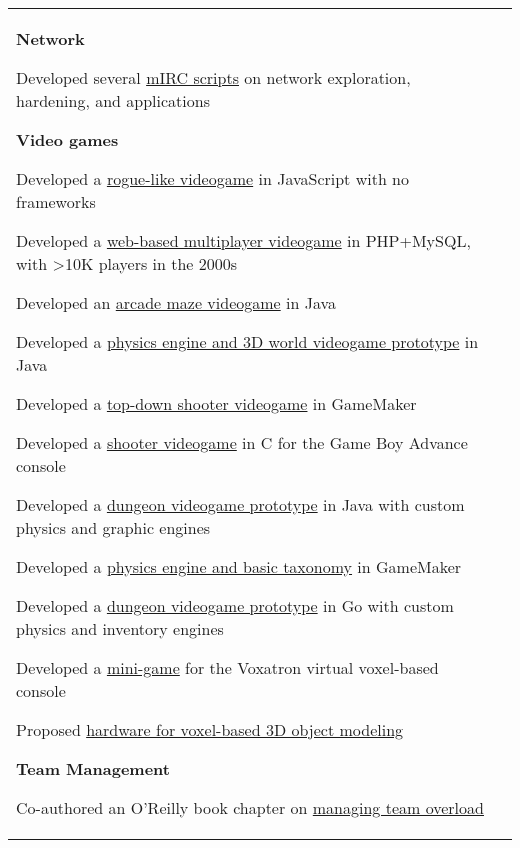 \documentclass[letterpaper,10pt,oneside]{article}
\newcommand{\itemspacingtwo}{\vspace{0.08cm}}
\newenvironment{body}
{\par\par
\begin{longtable}{p{0.145\textwidth}p{0.81\textwidth}}}
{\par\end{longtable}\par}
\begin{document}
\begin{body}
\textbf{Network}
\begin{comp}
\item Developed several \href{https://github.com/lquesada/My-mIRC-Scripts}{mIRC scripts} on network exploration, hardening, and applications
\end{comp}
\itemspacingtwo

\textbf{Video games}
\begin{comp}
\item Developed a \href{https://cavernal.github.io/cavernal}{rogue-like videogame} in JavaScript with no frameworks
\item Developed a \href{https://github.com/lquesada/LifoSource}{web-based multiplayer videogame} in PHP+MySQL, with >10K players in the 2000s
\item Developed an \href{https://github.com/lquesada/Cocoman}{arcade maze videogame} in Java
\item Developed a \href{https://github.com/lquesada/MineWorld}{physics engine and 3D world videogame prototype} in Java
\item Developed a \href{https://github.com/lquesada/AlienZeed}{top-down shooter videogame} in GameMaker
\item Developed a \href{https://github.com/lquesada/SpaceARMy}{shooter videogame} in C for the Game Boy Advance console
\item Developed a \href{https://github.com/lquesada/RogueCave}{dungeon videogame prototype} in Java with custom physics and graphic engines
\item Developed a \href{https://github.com/lquesada/PhysicsEngine}{physics engine and basic taxonomy} in GameMaker
\item Developed a \href{https://github.com/lquesada/CaveExplorer}{dungeon videogame prototype} in Go with custom physics and inventory engines
\item Developed a \href{https://github.com/lquesada/PiticliSim}{mini-game} for the Voxatron virtual voxel-based console
\item Proposed \href{https://www.tdcommons.org/dpubs_series/4167/}{hardware for voxel-based 3D object modeling}
\end{comp}
\itemspacingtwo

\textbf{Team Management}
\begin{comp}
\item Co-authored an O'Reilly book chapter on \href{https://landing.google.com/sre/workbook/chapters/overload/}{managing team overload}
\end{comp}
\itemspacingtwo


\end{body}
\end{document}
